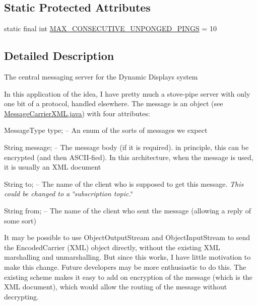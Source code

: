 \subsection*{Static Protected Attributes}
\begin{DoxyCompactItemize}
\item 
static final int \hyperlink{classgov_1_1fnal_1_1ppd_1_1dd_1_1chat_1_1MessagingServer_abb85ff8b189da86dfc20bd3313ea79d6}{M\-A\-X\-\_\-\-C\-O\-N\-S\-E\-C\-U\-T\-I\-V\-E\-\_\-\-U\-N\-P\-O\-N\-G\-E\-D\-\_\-\-P\-I\-N\-G\-S} = 10
\end{DoxyCompactItemize}


\subsection{Detailed Description}
The central messaging server for the Dynamic Displays system

In this application of the idea, I have pretty much a stove-\/pipe server with only one bit of a protocol, handled elsewhere. The message is an object (see \hyperlink{MessageCarrierXML_8java}{Message\-Carrier\-X\-M\-L.\-java}) with four attributes\-: 
\begin{DoxyItemize}
\item Message\-Type type; -- An enum of the sorts of messages we expect 
\item String message; -- The message body (if it is required). in principle, this can be encrypted (and then A\-S\-C\-I\-I-\/fied). In this architecture, when the message is used, it is usually an X\-M\-L document 
\item String to; -- The name of the client who is supposed to get this message. {\itshape This could be changed to a \char`\"{}subscription topic.\char`\"{}} 
\item String from; -- The name of the client who sent the message (allowing a reply of some sort) 
\end{DoxyItemize}

It may be possible to use Object\-Output\-Stream and Object\-Input\-Stream to send the Encoded\-Carrier (X\-M\-L) object directly, without the existing X\-M\-L marshalling and unmarshalling. But since this works, I have little motivation to make this change. Future developers may be more enthusiastic to do this. The existing scheme makes it easy to add on encryption of the message (which is the X\-M\-L document), which would allow the routing of the message without decrypting. 

